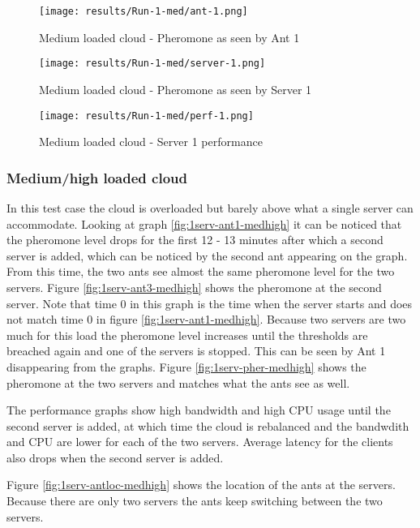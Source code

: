 \begin{figure}[!ht]
	\centering
		\texttt{[image: results/Run-1-med/ant-1.png]}
	\caption{Medium loaded cloud - Pheromone as seen by Ant 1}
	\label{fig:1serv-ant-med}
\end{figure}

\begin{figure}
	\centering
		\texttt{[image: results/Run-1-med/server-1.png]}
	\caption{Medium loaded cloud - Pheromone as seen by Server 1}
	\label{fig:1serv-pher-med}
\end{figure}

\begin{figure}
	\centering
		\texttt{[image: results/Run-1-med/perf-1.png]}
	\caption{Medium loaded cloud - Server 1 performance}
	\label{fig:1serv-perf-med}
\end{figure}

\subsubsection{Medium/high loaded cloud}

In this test case the cloud is overloaded but barely above what a single server can accommodate. Looking at graph \ref{fig:1serv-ant1-medhigh} it can be noticed that the pheromone level drops for the first 12 - 13 minutes after which a second server is added, which can be noticed by the second ant appearing on the graph. From this time, the two ants see almost the same pheromone level for the two servers. Figure \ref{fig:1serv-ant3-medhigh} shows the pheromone at the second server. Note that time 0 in this graph is the time when the server starts and does not match time 0 in figure \ref{fig:1serv-ant1-medhigh}. Because two servers are two much for this load the pheromone level increases until the thresholds are breached again and one of the servers is stopped. This can be seen by Ant 1 disappearing from the graphs. Figure \ref{fig:1serv-pher-medhigh} shows the pheromone at the two servers and matches what the ants see as well.

The performance graphs show high bandwidth and high CPU usage until the second server is added, at which time the cloud is rebalanced and the bandwdith and CPU are lower for each of the two servers. Average latency for the clients also drops when the second server is added.

Figure \ref{fig:1serv-antloc-medhigh} shows the location of the ants at the servers. Because there are only two servers the ants keep switching between the two servers.

